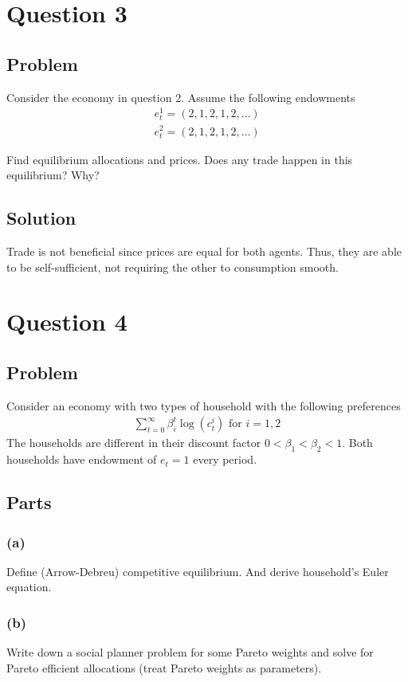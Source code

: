\documentclass[10pt, a4paper]{article}
\begin{document}
\section*{Question 3}
  \subsection*{Problem}
    Consider the economy in question 2. Assume the following endowments
    \begin{gather*}
      e^1_t = (2,1,2,1,2,\ldots)\\
      e^2_t = (2,1,2,1,2,\ldots)
    \end{gather*}

    Find equilibrium allocations and prices. Does any trade happen in this equilibrium? Why?
  \subsection*{Solution}
    Trade is not beneficial since prices are equal for both agents. Thus, they are able to be self-sufficient, not requiring the other to consumption smooth.
\section*{Question 4}
  \subsection*{Problem}
    Consider an economy with two types of household with the following preferences
    \begin{gather*}
      \sum_{t=0}^{\infty} \beta_i^t \log(c^i_t) \text{ for } i = 1,2
    \end{gather*}
    The households are different in their discount factor $0 < \beta_1 < \beta_2 < 1$. Both households have endowment of $e_t = 1$ every period.
  \subsection*{Parts}
    \subsubsection*{(a)}
      Define (Arrow-Debreu) competitive equilibrium. And derive household's Euler equation.
    \subsubsection*{(b)}
      Write down a social planner problem for some Pareto weights and solve for Pareto efficient allocations (treat Pareto weights as parameters).
\end{document}
